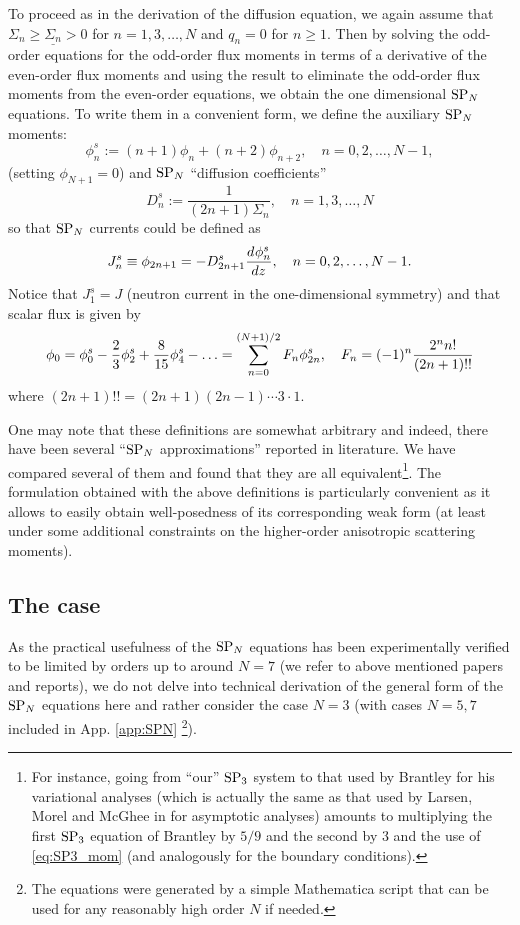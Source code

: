To proceed as in the derivation of the diffusion equation, we again assume that $\Sigma_n \geq \underline{\Sigma_n} > 0$
for $n = 1,3,\ldots,N$ and $q_n = 0$ for $n \geq 1$. Then by solving the
odd-order equations for the odd-order flux moments in terms of a derivative of the even-order flux moments and using the
result to eliminate the odd-order flux moments from the even-order equations, we obtain the one dimensional $\SPN$ 
equations. To write them in a convenient form, we define the auxiliary $\SPN$ moments:
\begin{equation}\label{eq:SP3_mom}
	\phi^s_n := (n+1) \phi _{n}+(n+2) \phi _{n+2},\quad n = 0,2,\ldots,N-1,
\end{equation}
(setting $\phi_{N+1} = 0$)
and $\SPN$ ``diffusion coefficients''
\begin{equation}\label{eq:SP3_dif}
	D^s_n := \frac{1}{(2 n+1) \Sigma _{n}},\quad n = 1,3,\ldots,N
\end{equation}
so that $\SPN$ currents could be defined as
$$
	J^s_n \equiv \phi_{2n+1} = -D^s_{2n+1}\der{\phi^s_n}{z}, \quad n = 0,2,\ldots,N-1.
$$
Notice that $J^s_1 = J$ (neutron current in the one-dimensional symmetry) and that scalar flux is given by
\begin{equation}\label{eq:SPN_scalar_flux}
	\phi_0 = \phi^s_0 - {\frac23}\phi^s_2 + {\frac{8}{15}}\phi^s_4 - \ldots = \suma[n]{0}{(N+1)/2}{F_{n}}\phi^s_{2n},\quad
	F_{n} = (-1)^n\frac{2^nn!}{(2n+1)\text{!!}}
\end{equation}
where
$(2n+1)!! = (2n+1)(2n-1)\cdots 3\cdot 1$.

One may note that these definitions are somewhat arbitrary and indeed, there have been several ``$\SPN$ approximations''
reported in literature. We have compared several of them and found that they are all equivalent\footnote{For instance,
going from ``our'' $\SPN[3]$ system to that used by Brantley \cite{Brantley1} for his variational analyses (which is
actually the same as that used by Larsen, Morel and McGhee in \cite{Larsen1} for asymptotic analyses) amounts to multiplying the
first $\SPN[3]$ equation of Brantley by $5/9$ and the second by $3$ and the use of \eqref{eq:SP3_mom} (and
analogously for the boundary conditions).}.
The formulation obtained with the above definitions is particularly convenient as it allows to easily obtain 
well-posedness of its corresponding weak form (at least under some additional constraints on the higher-order
anisotropic scattering moments).


\subsection{The \SPN[3] case}\label{sec:sp3}
As the practical usefulness of the $\SPN$ equations has been experimentally verified to be limited by orders up
to around $N = 7$ (we refer to above mentioned papers and reports), we do not delve into technical derivation of the
general form of the $\SPN$ equations here and rather consider the case $N=3$ (with cases $N = 5,7$ included in App.
\ref{app:SPN} \footnote{The equations were generated by a simple Mathematica script that can
be used for any reasonably high order $N$ if needed.}). 

